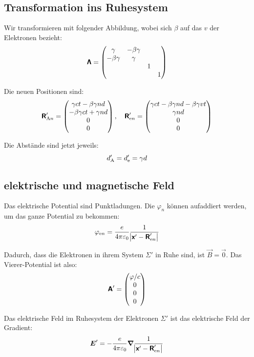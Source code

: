 \subsection{Transformation ins Ruhesystem}

Wir transformieren mit folgender Abbildung, wobei sich $\beta$ auf das $v$ der
Elektronen bezieht:
\[
	\boldsymbol{\mathsf{\Lambda}}
	=
	\begin{pmatrix}
		\gamma & -\beta\gamma & & \\
		-\beta\gamma & \gamma & & \\
									& & 1 & \\
									& & & 1
	\end{pmatrix}
\]

Die neuen Positionen sind:
\[
	\boldsymbol{\mathsf{R}}'_{\text An}
	=
	\begin{pmatrix}
		\gamma ct - \beta \gamma n d \\
		-\beta \gamma c t + \gamma n d \\
		0 \\
		0
	\end{pmatrix}
	,\quad
	\boldsymbol{\mathsf{R}}'_{\text en}
	=
	\begin{pmatrix}
		\gamma ct - \beta \gamma n d - \beta \gamma v t \\
		\gamma n d \\
		0 \\
		0
	\end{pmatrix}
\]

Die Abstände sind jetzt jeweils:
\[
	d'_{\text A} = d'_{\text e} = \gamma d
\]

\subsection{elektrische und magnetische Feld}

Das elektrische Potential sind Punktladungen. Die $\varphi_n$ können aufaddiert
werden, um das ganze Potential zu bekommen:
\[
	\varphi_{\text en}
	= \frac{e}{4\pi\varepsilon_0}
	\frac{1}{\abs{\boldsymbol{\mathsf{x}}' - \boldsymbol{\mathsf{R}}'_{\text en}}}
\]

Dadurch, dass die Elektronen in ihrem System $\Sigma'$ in Ruhe sind, ist $\vec
B = \vec 0$. Das Vierer-Potential ist also:
\[
	\boldsymbol{\mathsf{A}}'
	=
	\begin{pmatrix}
		\varphi / c \\ 0 \\ 0 \\ 0
	\end{pmatrix}
\]

Das elektrische Feld im Ruhesystem der Elektronen $\Sigma'$ ist das elektrische Feld der Gradient:
\[
	\boldsymbol{E}'
	= - \frac{e}{4\pi\varepsilon_0}
	\boldsymbol{\nabla} \frac{1}{\abs{\boldsymbol{\mathsf{x}}' - \boldsymbol{\mathsf{R}}'_{\text en}}}
\]

